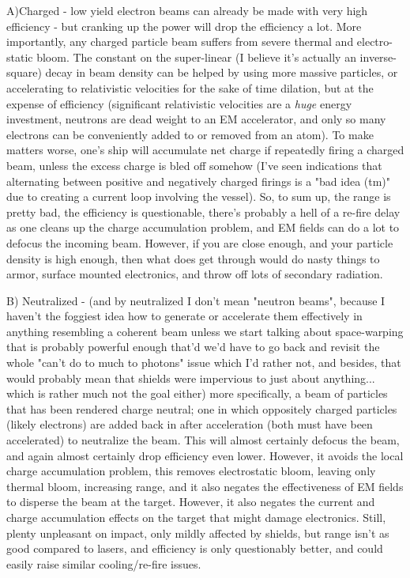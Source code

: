 \begin{itemize}
A)Charged - low yield electron beams can already be made with very
high efficiency - but cranking up the power will drop the efficiency a
lot. More importantly, any charged particle beam suffers from severe
thermal and electro-static bloom. The constant on the super-linear (I
believe it's actually an inverse-square) decay in beam density can be
helped by using more massive particles, or accelerating to
relativistic velocities for the sake of time dilation, but at the
expense of efficiency (significant relativistic velocities are a
{\em huge} energy investment, neutrons are dead weight to an EM
accelerator, and only so many electrons can be conveniently added to
or removed from an atom). To make matters worse, one's ship will
accumulate net charge if repeatedly firing a charged beam, unless the
excess charge is bled off somehow (I've seen indications that
alternating between positive and negatively charged firings is a "bad
idea (tm)" due to creating a current loop involving the vessel). So,
to sum up, the range is pretty bad, the efficiency is questionable,
there's probably a hell of a re-fire delay as one cleans up the charge
accumulation problem, and EM fields can do a lot to defocus the
incoming beam. However, if you are close enough, and your particle
density is high enough, then what does get through would do nasty
things to armor, surface mounted electronics, and throw off lots of
secondary radiation.  

B) Neutralized - (and by neutralized I don't mean "neutron beams",
because I haven't the foggiest idea how to generate or accelerate them
effectively in anything resembling a coherent beam unless we start
talking about space-warping that is probably powerful enough that'd
we'd have to go back and revisit the whole "can't do to much to
photons" issue which I'd rather not, and besides, that would probably
mean that shields were impervious to just about anything... which is
rather much not the goal either) more specifically, a beam of
particles that has been rendered charge neutral; one in which
oppositely charged particles (likely electrons) are added back in
after acceleration (both must have been accelerated) to neutralize the
beam. This will almost certainly defocus the beam, and again almost
certainly drop efficiency even lower. However, it avoids the local
charge accumulation problem, this removes electrostatic bloom, leaving
only thermal bloom, increasing range, and it also negates the
effectiveness of EM fields to disperse the beam at the
target. However, it also negates the current and charge accumulation
effects on the target that might damage electronics. Still, plenty
unpleasant on impact, only mildly affected by shields, but range isn't
as good compared to lasers, and efficiency is only questionably
better, and could easily raise similar cooling/re-fire issues.


\end{itemize}

